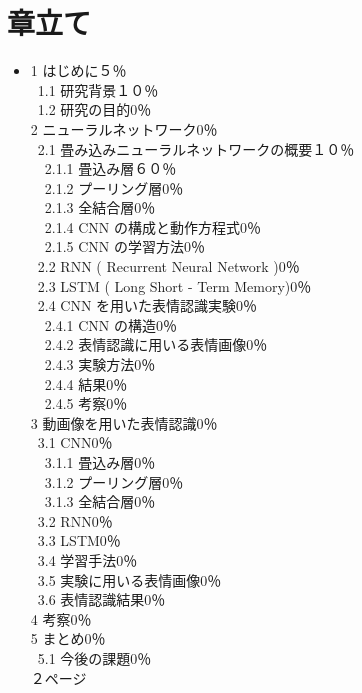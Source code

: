 \section{章立て}
\begin{itemize}
\item 1 はじめに５％\\
  \ 1.1 研究背景１０％\\
  \ 1.2 研究の目的0％\\
  2 ニューラルネットワーク0％\\
  \ 2.1 畳み込みニューラルネットワークの概要１０％\\
  \ \ 2.1.1 畳込み層６０％\\
  \ \ 2.1.2 プーリング層0％\\
  \ \ 2.1.3 全結合層0％\\
  \ \ 2.1.4 CNN の構成と動作方程式0％\\
  \ \ 2.1.5 CNN の学習方法0％\\
  \ 2.2 RNN ( Recurrent Neural Network )0％\\
  \ 2.3 LSTM ( Long Short - Term Memory)0％\\
  \ 2.4 CNN を用いた表情認識実験0％\\
  \ \ 2.4.1 CNN の構造0％\\
  \ \ 2.4.2 表情認識に用いる表情画像0％\\
  \ \ 2.4.3 実験方法0％\\
  \ \ 2.4.4 結果0％\\
  \ \ 2.4.5 考察0％\\
  3 動画像を用いた表情認識0％\\
  \ 3.1 CNN0％\\
  \ \ 3.1.1 畳込み層0％\\
  \ \ 3.1.2 プーリング層0％\\
  \ \ 3.1.3 全結合層0％\\
  \ 3.2 RNN0％\\
  \ 3.3 LSTM0％\\
  \ 3.4 学習手法0％\\
  \ 3.5 実験に用いる表情画像0％\\
  \ 3.6 表情認識結果0％\\
  4 考察0％\\
  5 まとめ0％\\
  \ 5.1 今後の課題0％\\
  ２ページ
\end{itemize}

